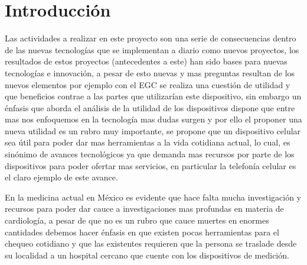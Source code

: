 
\chapter{Introducción}
Las actividades a realizar en este proyecto son una serie de consecuencias dentro de las nuevas tecnologías que se implementan a diario como nuevos proyectos, los resultados de estos proyectos (antecedentes a este) han sido bases para nuevas tecnologías e innovación, a pesar de esto nuevas y mas preguntas resultan de los nuevos elementos por ejemplo con el EGC se realiza una cuestión de utilidad y que beneficios contrae a las partes que utilizarían este dispositivo, sin embargo un énfasis que aborda el análisis de la utilidad de los dispositivos dispone que entre mas nos enfoquemos en la tecnología mas dudas surgen y por ello el proponer una nueva utilidad es un rubro muy importante, se propone que un dispositivo celular sea útil para poder dar mas herramientas a la vida cotidiana actual, lo cual, es sinónimo de avances tecnológicos ya que demanda mas recursos por parte de los dispositivos para poder ofertar mas servicios, en particular la telefonía celular es el claro ejemplo de este avance.

En la medicina actual en México es evidente que hace falta mucha investigación y recursos para poder dar cauce a investigaciones mas profundas en materia de cardiología, a pesar de que no es un rubro que cauce muertes en enormes cantidades debemos hacer énfasis en que existen pocas herramientas para el chequeo cotidiano y que las existentes requieren que la persona se traslade desde su localidad a un hospital cercano que cuente con los dispositivos de medición.
